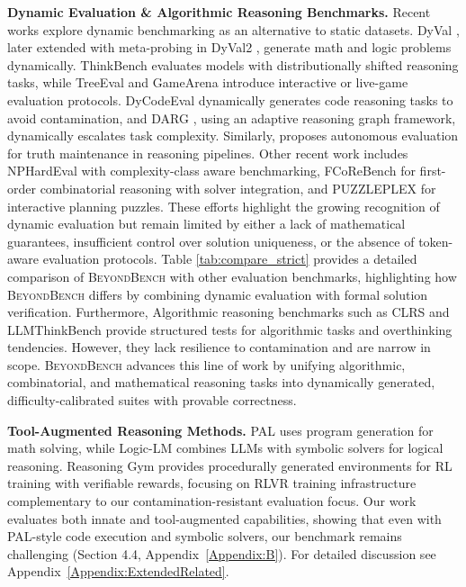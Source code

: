\documentclass{article} %
\theoremstyle{plain}
\theoremstyle{definition}
\newcommand{\our}{\textsc{BeyondBench}\xspace}
\newcommand{\rebuttal}[1]{{\color{RebuttalGreen}#1}}
\begin{document}
\textbf{Dynamic Evaluation \& Algorithmic Reasoning Benchmarks.}  Recent works explore dynamic benchmarking as an alternative to static datasets. DyVal \citep{zhu2023dyval}, later extended with meta-probing in DyVal2 \citep{zhu2024dyval2}, generate math and logic problems dynamically. ThinkBench \citep{huang2025thinkbench} evaluates models with distributionally shifted reasoning tasks, while TreeEval \citep{li2024treeeval} and GameArena \citep{gamearena2024} introduce interactive or live-game evaluation protocols. DyCodeEval \citep{chendycodeeval} dynamically generates code reasoning tasks to avoid contamination, and DARG \citep{zhang2024darg}, using an adaptive reasoning graph framework, dynamically escalates task complexity. Similarly, \citep{kariaautonomous} proposes autonomous evaluation for truth maintenance in reasoning pipelines. \rebuttal{Other recent work includes NPHardEval \citep{fan-etal-2024-nphardeval} with complexity-class aware benchmarking, FCoReBench \citep{mittal2024fcorebench} for first-order combinatorial reasoning with solver integration, and PUZZLEPLEX \citep{long2025puzzleplex} for interactive planning puzzles.} These efforts highlight the growing recognition of dynamic evaluation but remain limited by either a lack of mathematical guarantees, insufficient control over solution uniqueness, or the absence of token-aware evaluation protocols. Table \ref{tab:compare_strict} provides a detailed comparison of \our with other evaluation benchmarks, highlighting how \our  differs by combining dynamic evaluation with formal solution verification. Furthermore, Algorithmic reasoning benchmarks such as CLRS \citep{velickovic2022clrs} and LLMThinkBench \citep{srivastava2025thinkbench} provide structured tests for algorithmic tasks and overthinking tendencies. However, they lack resilience to contamination and are narrow in scope. \our advances this line of work by unifying algorithmic, combinatorial, and mathematical reasoning tasks into dynamically generated, difficulty-calibrated suites with provable correctness.

\rebuttal{\textbf{Tool-Augmented Reasoning Methods.} PAL \citep{gao2023pal} uses program generation for math solving, while Logic-LM \citep{pan2023logic} combines LLMs with symbolic solvers for logical reasoning. Reasoning Gym \citep{stojanovski2025reasoninggym} provides procedurally generated environments for RL training with verifiable rewards, focusing on RLVR training infrastructure complementary to our contamination-resistant evaluation focus. Our work evaluates both innate and tool-augmented capabilities, showing that even with PAL-style code execution and symbolic solvers, our benchmark remains challenging (Section 4.4, Appendix~\ref{Appendix:B}). For detailed discussion see Appendix~\ref{Appendix:ExtendedRelated}.}
\end{document}
